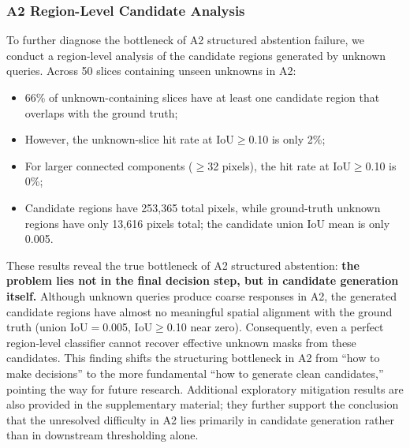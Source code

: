 \documentclass[journal]{IEEEtai}
\begin{document}
\subsubsection{A2 Region-Level Candidate Analysis}\label{sec:exp:analysis:region}

To further diagnose the bottleneck of A2 structured abstention failure, we conduct
a region-level analysis of the candidate regions generated by unknown queries.
Across 50 slices containing unseen unknowns in A2:

\begin{itemize}[nosep]
  \item 66\% of unknown-containing slices have at least one candidate region that
        overlaps with the ground truth;
  \item However, the unknown-slice hit rate at IoU$\geq$0.10 is only 2\%;
  \item For larger connected components ($\geq$32 pixels), the hit rate at
        IoU$\geq$0.10 is 0\%;
  \item Candidate regions have 253,365 total pixels, while ground-truth unknown
        regions have only 13,616 pixels total; the candidate union IoU mean is only 0.005.
\end{itemize}

These results reveal the true bottleneck of A2 structured abstention:
\textbf{the problem lies not in the final decision step, but in candidate generation
itself.}
Although unknown queries produce coarse responses in A2, the generated candidate regions
have almost no meaningful spatial alignment with the ground truth
(union IoU$=$0.005, IoU$\geq$0.10 near zero).
Consequently, even a perfect region-level classifier cannot recover effective unknown
masks from these candidates.
This finding shifts the structuring bottleneck in A2 from ``how to make decisions''
to the more fundamental ``how to generate clean candidates,''
pointing the way for future research.
Additional exploratory mitigation results are also provided in the supplementary
material; they further support the conclusion that the unresolved difficulty in A2 lies
primarily in candidate generation rather than in downstream thresholding alone.
\end{document}
